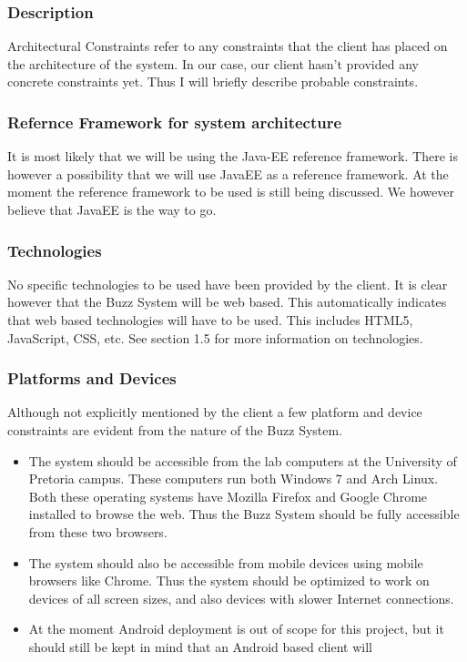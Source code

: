 \subsubsection{Description}

Architectural Constraints refer to any constraints that the client has placed on the architecture of the system. In our case, our client hasn't provided any concrete constraints yet. Thus I will briefly describe probable constraints. 

\subsubsection{Refernce Framework for system architecture}

It is most likely that we will be using the Java-EE reference framework. There is however a possibility that we will use JavaEE as a reference framework. At the moment the reference framework to be used is still being discussed. We however believe that JavaEE is the way to go. 

\subsubsection{Technologies}

No specific technologies to be used have been provided by the client. It is clear however that the Buzz System will be web based. This automatically indicates that web based technologies will have to be used. This includes HTML5, JavaScript, CSS, etc. See section 1.5 for more information on technologies. 

\subsubsection{Platforms and Devices}

Although not explicitly mentioned by the client a few platform and device constraints are evident from the nature of the Buzz System.

\begin{itemize}
	\item The system should be accessible from the lab computers at the University of Pretoria campus. These computers run both Windows 7 and Arch Linux. Both these operating systems have Mozilla Firefox and Google Chrome installed to browse the web. Thus the Buzz System should be fully accessible from these two browsers. 

	\item The system should also be accessible from mobile devices using mobile browsers like Chrome. Thus the system should be optimized to work on devices of all screen sizes, and also devices with slower Internet connections. 

	\item At the moment Android deployment is out of scope for this project, but it should still be kept in mind that an Android based client will 
\end{itemize}
